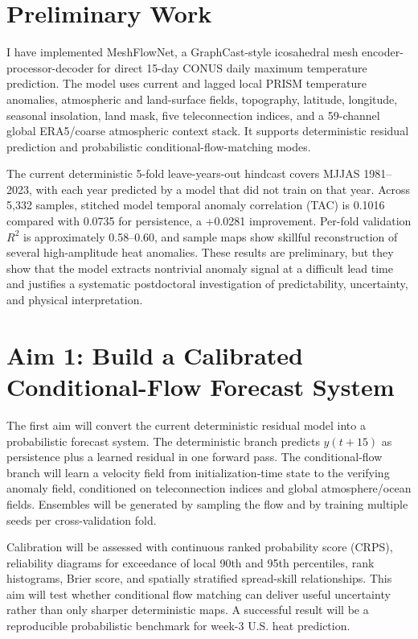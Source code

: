 \documentclass[11pt,letterpaper]{article}
\begin{document}
\section*{Preliminary Work}
I have implemented MeshFlowNet, a GraphCast-style icosahedral mesh encoder-processor-decoder for direct 15-day CONUS daily maximum temperature prediction. The model uses current and lagged local PRISM temperature anomalies, atmospheric and land-surface fields, topography, latitude, longitude, seasonal insolation, land mask, five teleconnection indices, and a 59-channel global ERA5/coarse atmospheric context stack. It supports deterministic residual prediction and probabilistic conditional-flow-matching modes.

The current deterministic 5-fold leave-years-out hindcast covers MJJAS 1981--2023, with each year predicted by a model that did not train on that year. Across 5,332 samples, stitched model temporal anomaly correlation (TAC) is 0.1016 compared with 0.0735 for persistence, a +0.0281 improvement. Per-fold validation $R^2$ is approximately 0.58--0.60, and sample maps show skillful reconstruction of several high-amplitude heat anomalies. These results are preliminary, but they show that the model extracts nontrivial anomaly signal at a difficult lead time and justifies a systematic postdoctoral investigation of predictability, uncertainty, and physical interpretation.

\section*{Aim 1: Build a Calibrated Conditional-Flow Forecast System}
The first aim will convert the current deterministic residual model into a probabilistic forecast system. The deterministic branch predicts $y(t+15)$ as persistence plus a learned residual in one forward pass. The conditional-flow branch will learn a velocity field from initialization-time state to the verifying anomaly field, conditioned on teleconnection indices and global atmosphere/ocean fields. Ensembles will be generated by sampling the flow and by training multiple seeds per cross-validation fold.

Calibration will be assessed with continuous ranked probability score (CRPS), reliability diagrams for exceedance of local 90th and 95th percentiles, rank histograms, Brier score, and spatially stratified spread-skill relationships. This aim will test whether conditional flow matching can deliver useful uncertainty rather than only sharper deterministic maps. A successful result will be a reproducible probabilistic benchmark for week-3 U.S. heat prediction.
\end{document}
